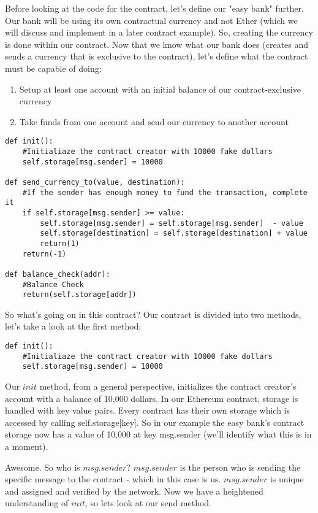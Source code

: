 \documentclass[10pt,twocolumn,letterpaper]{article}
\begin{document}
Before looking at the code for the contract, let's define our "easy bank" further. Our bank will be using its own contractual currency and not Ether (which we will discuss and implement in a later contract example). So, creating the currency is done within our contract. Now that we know what our bank does (creates and sends a currency that is exclusive to the contract), let's define what the contract must be capable of doing:
\begin{enumerate}
\item Setup at least one account with an initial balance of our contract-exclusive currency
\item Take funds from one account and send our currency to another account
\end{enumerate}


\begin{mdframed}
\begin{verbatim}
def init():
	#Initialiaze the contract creator with 10000 fake dollars
	self.storage[msg.sender] = 10000

def send_currency_to(value, destination):
	#If the sender has enough money to fund the transaction, complete it
	if self.storage[msg.sender] >= value:
		self.storage[msg.sender] = self.storage[msg.sender]  - value
		self.storage[destination] = self.storage[destination] + value
		return(1)
	return(-1)

def balance_check(addr):
	#Balance Check
	return(self.storage[addr])
\end{verbatim}
\end{mdframed}
		
		
So what's going on in this contract?
Our contract is divided into two methods, let's take a look at the first method:

\begin{verbatim}
def init():
	#Initialiaze the contract creator with 10000 fake dollars
	self.storage[msg.sender] = 10000
\end{verbatim}
 
Our $init$ method, from a general perspective, initializes the contract creator's account with a balance of 10,000 dollars. In our Ethereum contract, storage is handled with key value pairs. Every contract has their own storage which is accessed by calling self.storage[key]. So in our example the easy bank's contract storage now has a value of 10,000 at key msg.sender (we'll identify what this is in a moment).

 Awesome. So who is $msg.sender$? $msg.sender$ is the person who is sending the specific message to the contract - which in this case is us. $msg.sender$ is unique and assigned and verified by the network. Now we have a heightened understanding of $init$, so lets look at our send method.
\end{document}
